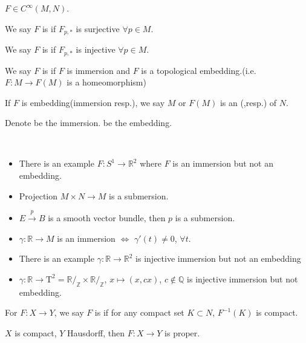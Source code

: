 \begin{definition}
     $ F\in C^\infty(M,N) $. 
     
     We say  $ F $ is  if  $ F_{p,*} $ is surjective $ \forall p\in M $.
     
     We say  $ F $ is  if  $ F_{p,*} $ is injective $ \forall p\in M $.

     We say  $ F $ is  if  $ F $ is  immersion and  $ F $ is a topological embedding.(i.e.  $ F:M\rightarrow F(M) $ is a homeomorphism) 

     If  $ F $ is embedding(immersion resp.), we say  $ M $ or  $ F(M) $ is an (,resp.) of  $ N $.   
     
     Denote   be the immersion.  be the embedding.
\end{definition}
\begin{example}
    \,\begin{itemize}
        \item There is an example  $ F:S^1\rightarrow\mathbb{R}^2 $ where  $ F $ is an immersion but not an embedding.
        \item  Projection $ M\times N\rightarrow M $ is a submersion.
        \item  $ E\xrightarrow{p}B $ is a smooth vector bundle, then  $ p $ is a submersion.
        \item  $ \gamma:\mathbb{R}\rightarrow M $ is an immersion $ \Leftrightarrow $ $ \gamma'(t)\not=0 $,  $ \forall t $.
        \item There is an example  $ \gamma:\mathbb{R}\rightarrow \mathbb{R}^2 $ is injective immersion but not an embedding   
        \item  $ \gamma:\mathbb{R}\rightarrow \mathrm{T}^2=\mathbb{R}/_\mathbb{Z}\times   \mathbb{R}/_\mathbb{Z} $,  $ x\mapsto (x,cx) $,  $ c\not\in \mathbb{Q} $ is injective immersion but not embedding.         
    \end{itemize}
\end{example}
\begin{definition}
    For  $ F:X\rightarrow Y $, we say  $ F $ is  if for any compact set  $ K\subset N $,  $ F^{-1}(K) $ is compact.    
\end{definition}
\begin{lemma}
     $ X $ is compact,  $ Y $ Hausdorff, then  $ F:X\rightarrow Y $ is proper.  
\end{lemma}
